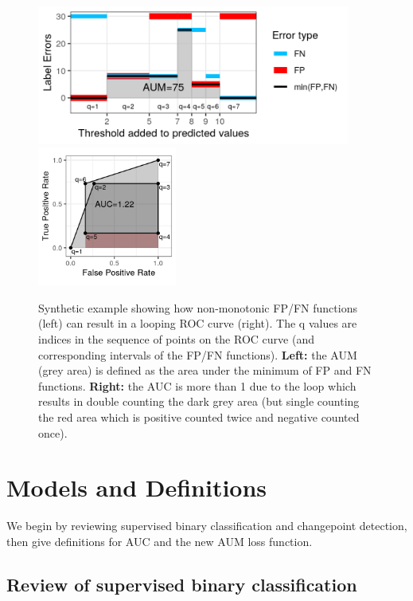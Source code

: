 \documentclass{article}
\begin{document}
\begin{figure}[t!]
\vskip 0.2in
\begin{center}
\includegraphics[height=1.8in]{figure-more-than-one-more-aum.png}
\includegraphics[height=1.8in]{figure-more-than-one-more-auc.png}
\vskip -0.5cm
\caption{Synthetic example showing how non-monotonic FP/FN functions (left) can result in a looping ROC curve (right).
The q values are indices in the sequence of points on the ROC curve (and corresponding intervals of the FP/FN functions).
\textbf{Left:} the AUM (grey area) is defined as the area under the minimum of FP and FN functions.
\textbf{Right:} the AUC is more than 1 due to the loop which results in double counting the dark grey area (but single counting the red area which is positive counted twice and negative counted once).
}
\label{fig:more}
\end{center}
\vskip -0.2in
\end{figure}



\section{Models and Definitions}
\label{sec:model}
We begin by reviewing supervised binary classification and changepoint detection, then give definitions for AUC and the new AUM loss function.
\subsection{Review of supervised binary classification}
\end{document}
